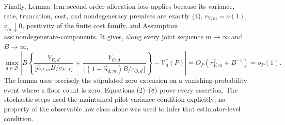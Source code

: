 Finally, Lemma~\(\mathrm{lem{:}second\text{-}order\text{-}allocation\text{-}loss}\) applies because its variance, rate, truncation, cost, and nondegeneracy premises are exactly (4), \(r_{V,m}=o(1)\), \(\underline v_m\downarrow0\), positivity of the finite cost family, and Assumption~\(\mathrm{ass{:}nondegenerate\text{-}components}\).  It gives, along every joint sequence \(m\to\infty\) and \(B\to\infty\),
\[
\max_{d\in\mathcal D}\left|B\left\{
\frac{V_{E,d}}{\lfloor\widehat\alpha_{d,m}B/c_{E,d}\rfloor}
+\frac{V_{O,d}}{\lfloor(1-\widehat\alpha_{d,m})B/c_{O,d}\rfloor}
\right\}-\mathcal V_d^*(P)\right|
=O_P(r_{V,m}^2+B^{-1})=o_P(1). \tag{8}
\]
The lemma uses precisely the stipulated zero extension on a vanishing-probability event where a floor count is zero.  Equations (2)--(8) prove every assertion.  The stochastic steps used the maintained pilot variance condition explicitly; no property of the observable law class alone was used to infer that estimator-level condition.